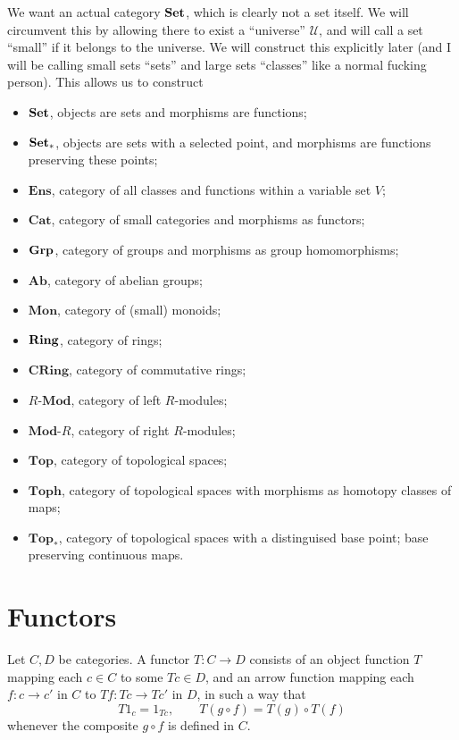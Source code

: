 We want an actual category $\mathbf{Set} $, which is clearly not a set itself. We will circumvent this by allowing there to exist a ``universe'' $\mathcal{U} $, and will call a set ``small'' if it belongs to the universe. We will construct this explicitly later (and I will be calling small sets ``sets'' and large sets ``classes'' like a normal fucking person). This allows us to construct
\begin{itemize}
	\item $\mathbf{Set} $, objects are sets and morphisms are functions;
	\item $\mathbf{Set}_*$, objects are sets with a selected point, and morphisms are functions preserving these points;
	\item $\mathbf{Ens} $, category of all classes and functions within a variable set $V$;
	\item $\mathbf{Cat} $, category of small categories and morphisms as functors;
	\item $\mathbf{Grp} $, category of groups and morphisms as group homomorphisms;
	\item $\mathbf{Ab} $, category of abelian groups;
	\item $\mathbf{Mon} $, category of (small) monoids;
	\item $\mathbf{Ring} $, category of rings;
	\item $\mathbf{CRing} $, category of commutative rings;
	\item $R$-$\mathbf{Mod} $, category of left $R$-modules;
	\item $\mathbf{Mod}$-$R$, category of right $R$-modules;
	\item $\mathbf{Top} $, category of topological spaces;
	\item $\mathbf{Toph} $, category of topological spaces with morphisms as homotopy classes of maps;
	\item $\mathbf{Top}_*$, category of topological spaces with a distinguised base point; base preserving continuous maps.
\end{itemize}

\section{Functors}

\begin{definition}[Functor]\label{dfn:1.3}
	Let $C,D$ be categories. A functor $T : C \to D$ consists of an object function $T$ mapping each $c\in C$ to some $Tc\in D$, and an arrow function mapping each $f : c \to c'$ in $C$ to $Tf : Tc \to Tc'$ in $D$, in such a way that
	\[
		T1_c=1_{Tc} ,\qquad T(g\circ f)=T(g)\circ T(f)
	\]
	whenever the composite $g\circ f$ is defined in $C$.
\end{definition}

